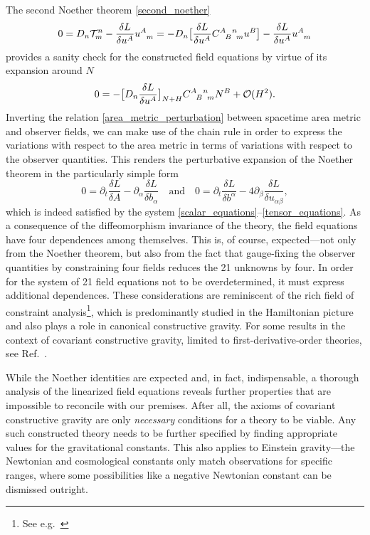 The second Noether theorem \eqref{second_noether}
\begin{equation}
  0 = D_n \mathcal T^n_m - \frac{\delta L}{\delta u^A}u^A_{\hphantom Am} = - D_n \big\lbrack\frac{\delta L}{\delta u^A} \gmc{A}{B}{n}{m} u^B\big\rbrack - \frac{\delta L}{\delta u^A}u^A_{\hphantom Am} 
\end{equation}
provides a sanity check for the constructed field equations by virtue of its expansion around $N$
\begin{equation}
  0 = -\big\lbrack D_n \frac{\delta L}{\delta u^A}\big\rbrack_{N+H} \gmc{A}{B}{n}{m} N^B + \mathcal O(H^2).
\end{equation}
Inverting the relation \eqref{area_metric_perturbation} between spacetime area metric and observer fields, we can make use of the chain rule in order to express the variations with respect to the area metric in terms of variations with respect to the observer quantities. This renders the perturbative expansion of the Noether theorem in the particularly simple form
\begin{equation}\label{second_noether_area_linear}
  0 = \partial_t \frac{\delta L}{\delta A} - \partial_\alpha \frac{\delta L}{\delta b_\alpha}\quad\text{and}\quad 0 = \partial_t\frac{\delta L}{\delta b^\alpha} - 4\partial_\beta\frac{\delta L}{\delta u_{\alpha\beta}},
\end{equation}
which is indeed satisfied by the system \eqref{scalar_equations}--\eqref{tensor_equations}. As a consequence of the diffeomorphism invariance of the theory, the field equations have four dependences among themselves. This is, of course, expected---not only from the Noether theorem, but also from the fact that gauge-fixing the observer quantities by constraining four fields reduces the 21 unknowns by four. In order for the system of 21 field equations not to be overdetermined, it must express additional dependences. These considerations are reminiscent of the rich field of constraint analysis\footnote{See e.g.~\cite{}}, which is predominantly studied in the Hamiltonian picture and also plays a role in canonical constructive gravity. For some results in the context of covariant constructive gravity, limited to first-derivative-order theories, see Ref.~\cite{}.

While the Noether identities are expected and, in fact, indispensable, a thorough analysis of the linearized field equations reveals further properties that are impossible to reconcile with our premises. After all, the axioms of covariant constructive gravity are only \emph{necessary} conditions for a theory to be viable. Any such constructed theory needs to be further specified by finding appropriate values for the gravitational constants. This also applies to Einstein gravity---the Newtonian and cosmological constants only match observations for specific ranges, where some possibilities like a negative Newtonian constant can be dismissed outright.

